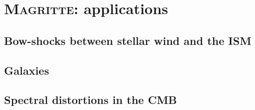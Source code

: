 \chapter{\textsc{Magritte}: applications}
\label{Chapter2}

\section{Bow-shocks between stellar wind and the ISM}

\section{Galaxies}

\section{Spectral distortions in the CMB}
